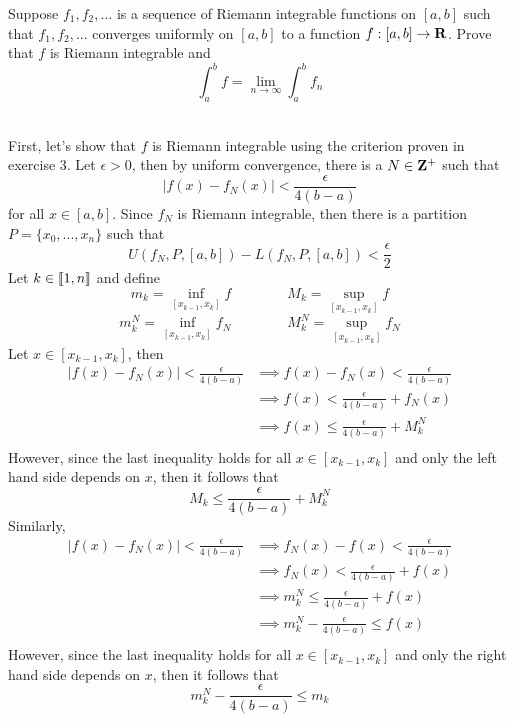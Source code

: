  \begin{exercise}
    Suppose $f_1, f_2, ...$ is a sequence of Riemann integrable functions on $[a,b]$ such that $f_1, f_2, ...$ converges uniformly on $[a,b]$ to a function $f : [a,b] \to \mathbf{R}$. Prove that $f$ is Riemann integrable and 
    $$\int_{a}^{b}f = \lim_{n \rightarrow \infty}\int_{a}^{b}f_n$$
 \end{exercise}

 \begin{solution}
    \\ First, let's show that $f$ is Riemann integrable using the criterion proven in exercise 3. Let $\epsilon > 0$, then by uniform convergence, there is a $N \in \mathbf{Z}^+$ such that
    $$|f(x) - f_N(x)| < \frac{\epsilon}{4(b-a)}$$
    for all $x \in [a,b]$. Since $f_N$ is Riemann integrable, then there is a partition $P = \{x_0, ..., x_n\}$ such that 
    $$U(f_N, P, [a,b]) - L(f_N, P, [a,b]) < \frac{\epsilon}{2}$$
    Let $k \in \llbracket 1 , n \rrbracket$ and define
    $$m_k = \inf_{[x_{k-1}, x_k]}f \qquad \qquad M_k = \sup_{[x_{k-1}, x_k]}f$$
    $$m_k^N = \inf_{[x_{k-1}, x_k]}f_N \qquad \qquad M_k^N = \sup_{[x_{k-1}, x_k]}f_N$$
    Let $x \in [x_{k-1}, x_k]$, then
    \begin{align*}
        |f(x) - f_N(x)| < \frac{\epsilon}{4(b-a)} &\implies f(x) - f_N(x) < \frac{\epsilon}{4(b-a)} \\
        &\implies f(x) < \frac{\epsilon}{4(b-a)} + f_N(x)\\
        &\implies f(x) \leq \frac{\epsilon}{4(b-a)} + M_k^N\\
    \end{align*}
    However, since the last inequality holds for all $x \in [x_{k-1}, x_k]$ and only the left hand side depends on $x$, then it follows that
    \[M_k \leq \frac{\epsilon}{4(b-a)} + M_k^N \tag*{(1)}\]
    Similarly, 
    \begin{align*}
        |f(x) - f_N(x)| < \frac{\epsilon}{4(b-a)} &\implies f_N(x) - f(x) < \frac{\epsilon}{4(b-a)} \\
        &\implies f_N(x) < \frac{\epsilon}{4(b-a)} + f(x)\\
        &\implies m_k^N \leq \frac{\epsilon}{4(b-a)} + f(x)\\
        &\implies m_k^N - \frac{\epsilon}{4(b-a)} \leq f(x)\\
    \end{align*}
    However, since the last inequality holds for all $x \in [x_{k-1}, x_k]$ and only the right hand side depends on $x$, then it follows that
    $$m_k^N - \frac{\epsilon}{4(b-a)} \leq m_k$$

\end{solution}
